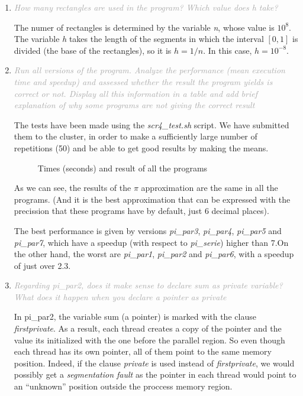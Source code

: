\documentclass{article}
\newcommand{\greyItem}[1]{\item\emph{\textcolor{darkgray}{#1}}}
\begin{document}
\begin{enumerate}[label=4.\arabic*,leftmargin=*]

\greyItem{How many rectangles are used in the program? Which value does h take?}

The numer of rectangles is determined by the variable \emph{n}, whose value is ${10^8}$. The variable \emph{h} takes the length of the segments in which the interval $[0,1]$ is divided (the base of the rectangles), so it is $h=1/n$. In this case, $h=10^{-8}$.

\greyItem{ Run all versions of the program. Analyze the performance (mean execution time and speedup) and assessed whether the result the program yields is correct or not. Display all this information in a table and add brief explanation of why some programs are not giving the correct result}

The tests have been made using the \emph{scr4\_test.sh} script. We have submitted them to the cluster, in order to make a sufficiently large number of repetitions (50) and be able to get good results by making the means.

\begin{figure}[h]
    
    \centering
    \caption{Times (seconds) and result of all the programs}
\end{figure}

As we can see, the results of the $\pi$ approximation are the same in all the programs. (And it is the best approximation that can be expressed with the precission that these programs have by default, just 6 decimal places).

The best performance is given by versions \emph{pi\_par3}, \emph{pi\_par4}, \emph{pi\_par5}  and \emph{pi\_par7}, which have a speedup (with respect to \emph{pi\_serie}) higher than 7.On the other hand, the worst are \emph{pi\_par1}, \emph{pi\_par2} and \emph{pi\_par6}, with a speedup of just over 2.3.

\greyItem{Regarding pi\_par2, does it make sense to declare sum as private variable? What does it happen when you declare a pointer as private}

In pi\_par2, the variable sum (a pointer) is marked with the clause \emph{firstprivate}. As a result, each thread creates a copy of the pointer and the value its initialized with the one before the parallel region. So even though each thread has its own pointer, all of them point to the same memory position. Indeed, if the clause \emph{private} is used instead of \emph{firstprivate}, we would possibly get a \emph{segmentation fault} as the pointer in each thread would point to an ``unknown'' position outside the proccess memory region.


\end{enumerate}
\end{document}
